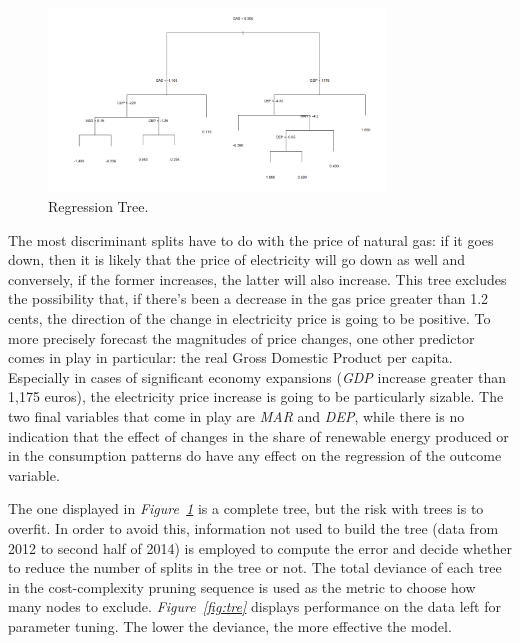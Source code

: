 \documentclass[a4paper,12pt]{book}
\begin{document}
\begin{figure}[tb]
\begin{center}
\captionsetup{justification=centering}
\includegraphics[width=0.8\textwidth]{Images/plot.png}
\caption{Regression Tree.}
\label{fig:plot}
\end{center}
\end{figure}

The most discriminant splits have to do with the price of natural gas: if it goes down, then it is likely that the price of electricity will go down as well and conversely, if the former increases, the latter will also increase. This tree excludes the possibility that, if there's been a decrease in the gas price greater than 1.2 cents, the direction of the change in electricity price is going to be positive. To more precisely forecast the magnitudes of price changes, one other predictor comes in play in particular: the real Gross Domestic Product per capita. Especially in cases of significant economy expansions (\textit{GDP} increase greater than 1,175 euros), the electricity price increase is going to be particularly sizable. The two final variables that come in play are \textit{MAR} and \textit{DEP}, while there is no indication that the effect of changes in the share of renewable energy produced or in the consumption patterns do have any effect on the regression of the outcome variable.

The one displayed in \textit{Figure~\ref{fig:plot}} is a complete tree, but the risk with trees is to overfit. In order to avoid this, information not used to build the tree (data from 2012 to second half of 2014) is employed to compute the error and decide whether to reduce the number of splits in the tree or not. The total deviance of each tree in the cost-complexity pruning sequence is used as the metric to choose how many nodes to exclude. \textit{Figure~\ref{fig:tre}} displays performance on the data left for parameter tuning. The lower the deviance, the more effective the model.
\end{document}
